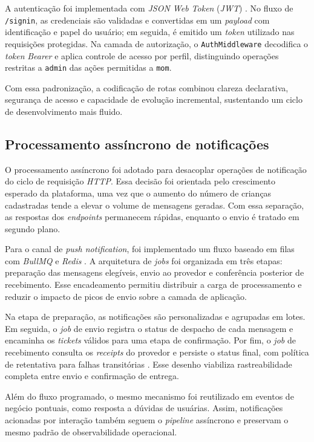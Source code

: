 A autenticação foi implementada com \emph{JSON Web Token} (\emph{JWT}) \cite{rfc7519jwt}. No fluxo de \texttt{/signin}, as credenciais são validadas e convertidas em um \emph{payload} com identificação e papel do usuário; em seguida, é emitido um \emph{token} utilizado nas requisições protegidas. Na camada de autorização, o \texttt{AuthMiddleware} decodifica o \emph{token} \emph{Bearer} e aplica controle de acesso por perfil, distinguindo operações restritas a \texttt{admin} das ações permitidas a \texttt{mom}.

Com essa padronização, a codificação de rotas combinou clareza declarativa, segurança de acesso e capacidade de evolução incremental, sustentando um ciclo de desenvolvimento mais fluido.

\subsection{Processamento assíncrono de notificações}

O processamento assíncrono foi adotado para desacoplar operações de notificação do ciclo de requisição \emph{HTTP}. Essa decisão foi orientada pelo crescimento esperado da plataforma, uma vez que o aumento do número de crianças cadastradas tende a elevar o volume de mensagens geradas. Com essa separação, as respostas dos \emph{endpoints} permanecem rápidas, enquanto o envio é tratado em segundo plano.

Para o canal de \emph{push notification}, foi implementado um fluxo baseado em filas com \emph{BullMQ} e \emph{Redis} \cite{bullmqdocs,redisdocs}. A arquitetura de \emph{jobs} foi organizada em três etapas: preparação das mensagens elegíveis, envio ao provedor e conferência posterior de recebimento. Esse encadeamento permitiu distribuir a carga de processamento e reduzir o impacto de picos de envio sobre a camada de aplicação.

Na etapa de preparação, as notificações são personalizadas e agrupadas em lotes. Em seguida, o \emph{job} de envio registra o status de despacho de cada mensagem e encaminha os \emph{tickets} válidos para uma etapa de confirmação. Por fim, o \emph{job} de recebimento consulta os \emph{receipts} do provedor e persiste o status final, com política de retentativa para falhas transitórias \cite{expopushdocs}. Esse desenho viabiliza rastreabilidade completa entre envio e confirmação de entrega.

Além do fluxo programado, o mesmo mecanismo foi reutilizado em eventos de negócio pontuais, como resposta a dúvidas de usuárias. Assim, notificações acionadas por interação também seguem o \emph{pipeline} assíncrono e preservam o mesmo padrão de observabilidade operacional.

